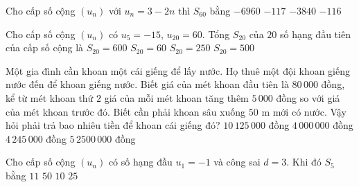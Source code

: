 \begin{ex}%
	Cho cấp số cộng $\left(u_n \right)$ với $u_n=3-2n$  thì $S_{60}$ bằng
	 \choice
		 {$-6960$}
		{$-117$} 
		 {\True $-3840$}
		 {$-116$}
\end{ex}

\begin{ex}%
	Cho cấp số cộng $\left(u_n \right)$ có $u_5=-15$, $u_{20}=60$. Tổng $S_{20}$  của $20$ số hạng đầu tiên của cấp số cộng là
	\choice 
		{$S_{20}=600$} 
		{$S_{20}=60$} 
		{\True $S_{20}=250$} 
		 {$S_{20}=500$}
\end{ex}

\begin{ex}%
	Một gia đình cần khoan một cái giếng để lấy nước. Họ thuê một đội khoan giếng nước đến để khoan giếng nước. Biết giá của mét khoan đầu tiên là $80\,000$ đồng, kể từ mét khoan thứ $2$ giá của mỗi  mét khoan tăng thêm $5\,000$ đồng so với giá của mét khoan trước đó. Biết cần phải khoan sâu xuống $50$ m mới có nước. Vậy hỏi phải trả bao nhiêu tiền để khoan cái giếng đó?
	 \choice
		{\True $10\,125\,000$  đồng}
		{$4\,000\,000$ đồng} 
		{$4\,245\,000$  đồng}
		{$5\,2500\,000$ đồng} 
\end{ex}

\begin{ex}%
	Cho cấp số cộng $\left(u_n\right)$ có số hạng đầu $u_1=-1$ và  công sai $d=3$. Khi đó $S_5$ bằng
	\choice 
		 {$11$}
		{$50$} 
		{$10$} 
		{\True  $25$}
\end{ex}

